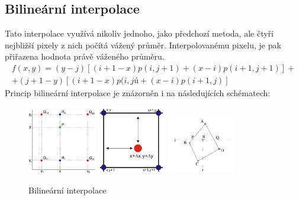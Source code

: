 \documentclass{thesis}%
\begin{document}
 \subsection{Bilineární interpolace}
Tato interpolace využívá nikoliv jednoho, jako předchozí metoda, ale čtyři nejbližší pixely z nich počítá vážený průměr. Interpolovanému pixelu, je pak přiřazena hodnota právě váženého průměru. 
\begin{equation}
\begin{split}
f(x,y) = (y-j) [(i+1-x)p(i,j+1)+(x-i)p(i+1,j+1)]+\\
+(j+1-y)[(i+1-x)p(i,jú+(x-i)p(i+1,j)]
\end{split}
\end{equation}
Princip bilineární interpolace je znázorněn i na následujících schématech:
\begin{figure}[ht!]
 \centering
	\includegraphics[width=3cm]{bil_int.png}
	\includegraphics[width=3cm]{bil_intII.png}
	\includegraphics[width=3cm]{bilinear_interpolationIV.png}
	
	\caption[Bilineární interpolace]{Bilineární interpolace}
\end{figure}
\end{document}
